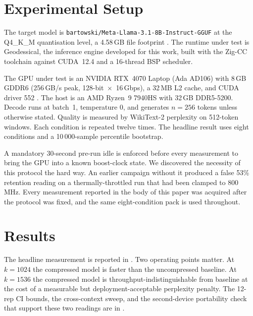 \documentclass[11pt]{article}
\begin{document}
\section{Experimental Setup}
\label{sec:setup}

The target model is \texttt{bartowski/Meta-Llama-3.1-8B-Instruct-GGUF} at
the Q4\_K\_M quantisation level, a 4.58\,GB file footprint
\cite{grattafiori2024llama3,ggerganov2023kquants}. The runtime under test
is Geodessical, the inference engine developed for this work, built with
the Zig-CC toolchain against CUDA~12.4 and a 16-thread BSP scheduler.

The GPU under test is an NVIDIA RTX~4070 Laptop (Ada AD106) with
8\,GB GDDR6 (256\,GB/s peak, 128-bit~$\times$~16\,Gbps), a 32\,MB L2
cache, and CUDA driver 552 \cite{nvidia2022ada}. The host is an AMD
Ryzen~9 7940HS with 32\,GB DDR5-5200. Decode runs at batch~1, temperature
$0$, and generates $n{=}256$ tokens unless otherwise stated. Quality is
measured by WikiText-2 perplexity \cite{merity2016wikitext} on 512-token
windows. Each condition is repeated twelve times. The headline result
uses eight conditions and a 10\,000-sample percentile bootstrap.

A mandatory 30-second pre-run idle is enforced before every measurement to
bring the GPU into a known boost-clock state. We discovered the necessity
of this protocol the hard way. An earlier campaign without it produced a
false 53\% retention reading on a thermally-throttled run that had been
clamped to 800\,MHz. Every measurement reported in the body of this paper
was acquired after the protocol was fixed, and the same eight-condition
pack is used throughout.
\FloatBarrier

\section{Results}
\label{sec:results}

The headline measurement is reported in . Two
operating points matter. At $k{=}1024$ the compressed model is faster than
the uncompressed baseline. At $k{=}1536$ the compressed model is
throughput-indistinguishable from baseline at the cost of a measurable but
deployment-acceptable perplexity penalty. The 12-rep CI bounds, the
cross-context sweep, and the second-device portability check that support
these two readings are in .
\end{document}
